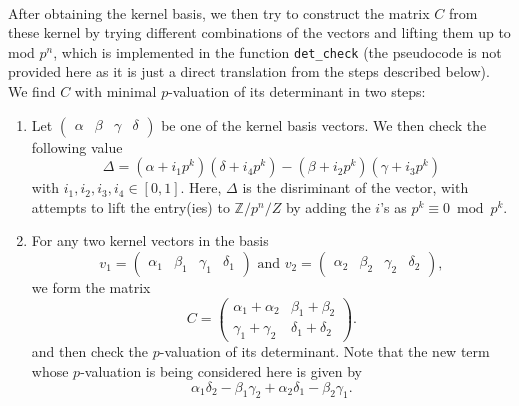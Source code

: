 \documentclass[letterpaper,12pt]{article}
\newcommand{\Z}{\mathbb{Z}}
\begin{document}
\

After obtaining the kernel basis, we then try to 
construct the matrix $C$ from these kernel by trying different combinations 
of the vectors and lifting them up to mod $p^n$,
which is implemented in the function \texttt{det\_check} 
(the pseudocode is not provided here as it is just a direct translation from the steps described below).
We find $C$ with minimal $p$-valuation of its determinant
in two steps:
\begin{enumerate}
\item Let $\begin{pmatrix}\alpha & \beta & \gamma & \delta\end{pmatrix}$ be one of the kernel basis vectors.
We then check the following value 
\[
\Delta = (\alpha + i_1p^k)(\delta + i_4p^k) - (\beta + i_2p^k)(\gamma + i_3p^k)
\]
with $i_1, i_2, i_3, i_4 \in [0, 1]$. 
Here, $\Delta$ is the disriminant of the vector, 
with attempts to lift the entry(ies) to $\Z/p^n /Z$ by 
adding the $i$'s as $p^k \equiv 0 \bmod p^k$.

\item For any two kernel vectors in the basis
\[
v_1 = \begin{pmatrix}\alpha_1 & \beta_1 & \gamma_1 & \delta_1 \end{pmatrix}
\text{ and }
v_2 = \begin{pmatrix}\alpha_2 & \beta_2 & \gamma_2 & \delta_2 \end{pmatrix},
\]
we form the matrix 
\[
C = \begin{pmatrix}
\alpha_1 + \alpha_2 & \beta_1 + \beta_2 \\
\gamma_1 + \gamma_2 & \delta_1 + \delta_2
\end{pmatrix}.
\]
and then check the $p$-valuation of its determinant.
Note that the new term whose $p$-valuation is being considered here is given by 
\[
\alpha_1 \delta_2 - \beta_1 \gamma_2 + \alpha_2 \delta_1 - \beta_2 \gamma_1.
\]
\end{enumerate}

\
\end{document}
